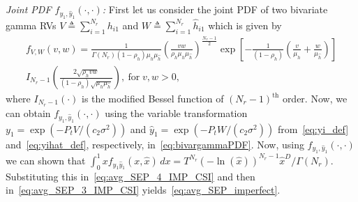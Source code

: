 \documentclass[12pt,draftcls,peerreview,onecolumn]{IEEEtran}
\newcommand{\define}{\triangleq}
\newcommand{\muh}{{\mu_{h}}}
\newcommand{\Nr}{{N_r}}
\newcommand{\Pt}{{P_t}}
\newcommand{\such}{h}
\newcommand{\hk}[1]{{\such_{#1}}}
\newcommand{\noisevar}{\sigma^2}
\newcommand{\ctwo}{c_{2}}
\newcommand{\yk}[1]{y_{#1}}
\newcommand{\snr}{\Omega}
\newcommand{\snrhat}{\widehat{\snr}}
\newcommand{\hhat}{\hat{\such}}
\newcommand{\hkhat}[1]{\hhat_{#1}}
\newcommand{\ykhat}[1]{\hat{y}_{#1}}
\newcommand{\muhhat}{\mu_{\hhat}}
\newcommand{\rhoh}{\rho_h}
\newcommand{\xhat}{\hat{x}}
\newcommand{\sumnr}{\sum_{i=1}^{\Nr}}
\begin{document}
{\em Joint PDF $f_{\yk{1},\ykhat{1}}\left(\cdot,\cdot\right)$:} First let us consider the joint PDF of two bivariate gamma RVs $V\define\sumnr\hk{i1}$ and $W\define\sumnr\hkhat{i1}$ which is given by~\cite[(6.1)]{simon_alouini_book}
\begin{multline}
\label{eq:bivargammaPDF}
f_{V,W}(v,w) = \frac{1}{\Gamma\left(\Nr \right) \left(1-\rhoh \right)\muh\muhhat }\left(\frac{vw}{\rhoh \muh\muhhat}\right)^{\frac{\Nr-1}{2}}\exp\left[{-\frac{1}{(1-\rhoh)}\left( \frac{v}{\muh}+\frac{w}{\muhhat}\right) } \right] \\ I_{\Nr-1}\left(\frac{2\sqrt{\rhoh vw}}{(1-\rhoh)\sqrt{\muh\muhhat}}\right),~\text{for}\; v,w>0,
\end{multline}
%  
where $I_{\Nr-1}\left(\cdot \right) $ is the modified Bessel function of $(\Nr-1)^{\text{th}}$ order. Now, we can obtain $f_{\yk{1},\ykhat{1}}\left(\cdot,\cdot\right)$ using the variable transformation $\yk{1}=\exp\left(-\Pt V/(\ctwo\noisevar) \right) $ and $\ykhat{1}=\exp\left(-\Pt W/(\ctwo\noisevar) \right)$ from~\eqref{eq:yi_def} and~\eqref{eq:yihat_def}, respectively, in~\eqref{eq:bivargammaPDF}.  
%
% 
Now, using $f_{\yk{1},\ykhat{1}}(\cdot,\cdot)$ we can  shown that $\int_{0}^{1} x f_{\yk{1}\ykhat{1}}\left(x,\xhat\right)\,dx = {T^{\Nr}\left(-\ln\left({\xhat} \right)\right)^{\Nr-1}\xhat^{D}}/{\Gamma\left(\Nr\right)}$.
Substituting this in~\eqref{eq:avg_SEP_4_IMP_CSI} and then in~\eqref{eq:avg_SEP_3_IMP_CSI}  yields~\eqref{eq:avg_SEP_imperfect}.
\end{document}
